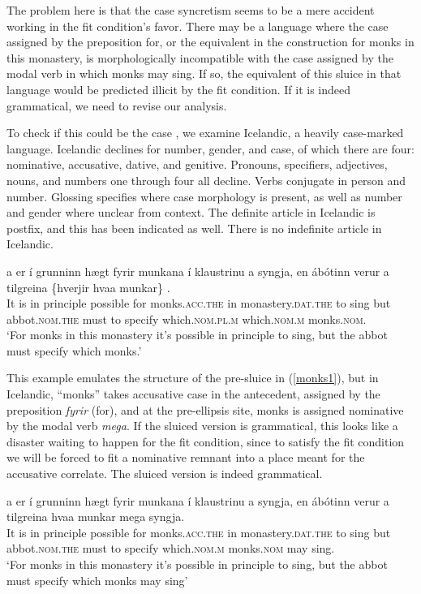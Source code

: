 \documentclass{turabian-researchpaper}
\begin{document}
\noindent The problem here is that the case syncretism seems to be a mere accident working in the fit condition's favor. There may be a language where the case assigned by the preposition for, or the equivalent in the construction for monks in this monastery, is morphologically incompatible with the case assigned by the modal verb in which monks may sing. If so, the equivalent of this sluice in that language would be predicted illicit by the fit condition. If it is indeed grammatical, we need to revise our analysis. 

To check if this could be the case , we examine Icelandic, a heavily case-marked language. Icelandic declines for number, gender, and case, of which there are four: nominative, accusative, dative, and genitive. Pronouns, specifiers, adjectives, nouns, and numbers one through four all decline. Verbs conjugate in person and number. Glossing specifies where case morphology is present, as well as number and gender where unclear from context. The definite article in Icelandic is postfix, and this has been indicated as well. There is no indefinite article in Icelandic. 

\begin{exe}
\ex\label{monksis1}
\gll  \TH a{\dh} er \'i  grunninn h\ae gt fyrir munkana \'i klaustrinu a{\dh} syngja, en \'ab\'otinn ver\dh ur a{\dh} tilgreina \{hverjir \textbar hva\dh a munkar\} . \\ 
It is in principle possible for monks.\textsc{acc.the}  in monastery.\textsc{dat.the}  to   sing         but  abbot.\textsc{nom.the} must    to  specify   which.\textsc{nom.pl.m} which.\textsc{nom.m} monks.\textsc{nom}.\\ 
\trans `For monks in this monastery it's possible in principle to sing, but the abbot must specify which monks.'
\end{exe}



This example emulates the structure of the pre-sluice in (\ref{monks1}), but in Icelandic, ``monks'' takes accusative case in the antecedent, assigned by the preposition \textit{fyrir} (for), and at the pre-ellipsis site, monks is assigned nominative by the modal verb \textit{mega}. If the sluiced version is grammatical, this looks like a disaster waiting to happen for the fit condition, since to satisfy the fit condition we will be forced to fit a nominative remnant into a place meant for the accusative correlate. The sluiced version is indeed grammatical. 

\begin{exe}
\ex\label{monksis2}
\gll \TH a{\dh} er \'i  grunninn h\ae gt fyrir munkana \'i klaustrinu a{\dh} syngja, en \'ab\'otinn ver\dh ur a{\dh} tilgreina hva\dh a munkar mega syngja. \\
It is in principle possible for monks.\textsc{acc.the}  in monastery.\textsc{dat.the}  to   sing         but  abbot.\textsc{nom.the} must    to  specify   which.\textsc{nom.m} monks.\textsc{nom} may  sing.\\ 
\trans `For monks in this monastery it's possible in principle to sing, but the abbot must specify which monks may sing'
\end{exe}
\end{document}
